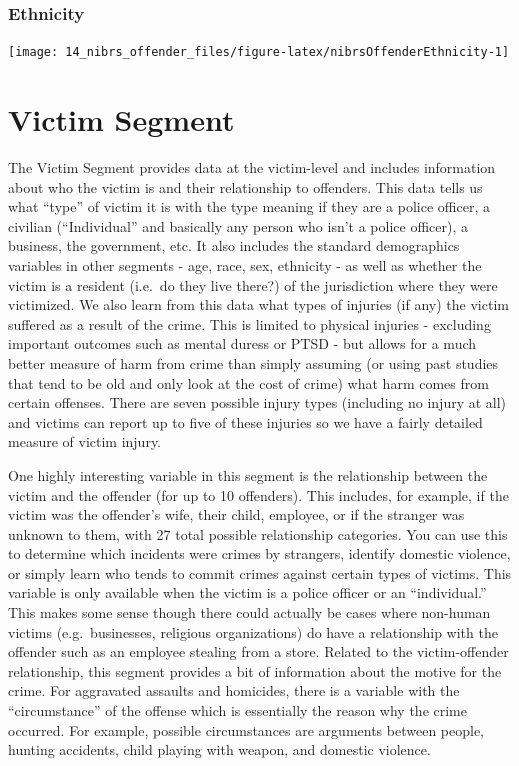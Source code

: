 \documentclass[
]{krantz}
\let\origfigure\figure
\let\endorigfigure\endfigure
\renewenvironment{figure}[1][2] {
    \expandafter\origfigure\expandafter[H]
} {
    \endorigfigure
}
\begin{document}
\subsection{Ethnicity}\label{ethnicity-2}

\begin{figure}

{\centering \texttt{[image: 14\_nibrs\_offender\_files/figure-latex/nibrsOffenderEthnicity-1]} 

}

\caption{The share of offenders by ethnicity, 1991-2022.}\label{fig:nibrsOffenderEthnicity}
\end{figure}

\chapter{Victim Segment}\label{victim-segment-1}

The Victim Segment provides data at the victim-level and
includes information about who the victim is and their
relationship to offenders. This data tells us what ``type''
of victim it is with the type meaning if they are a police
officer, a civilian (``Individual'' and basically any person
who isn't a police officer), a business, the government,
etc. It also includes the standard demographics variables in
other segments - age, race, sex, ethnicity - as well as
whether the victim is a resident (i.e.~do they live there?)
of the jurisdiction where they were victimized. We also
learn from this data what types of injuries (if any) the
victim suffered as a result of the crime. This is limited to
physical injuries - excluding important outcomes such as
mental duress or PTSD - but allows for a much better measure
of harm from crime than simply assuming (or using past
studies that tend to be old and only look at the cost of
crime) what harm comes from certain offenses. There are
seven possible injury types (including no injury at all) and
victims can report up to five of these injuries so we have a
fairly detailed measure of victim injury.

One highly interesting variable in this segment is the
relationship between the victim and the offender (for up to
10 offenders). This includes, for example, if the victim was
the offender's wife, their child, employee, or if the
stranger was unknown to them, with 27 total possible
relationship categories. You can use this to determine which
incidents were crimes by strangers, identify domestic
violence, or simply learn who tends to commit crimes against
certain types of victims. This variable is only available
when the victim is a police officer or an ``individual.''
This makes some sense though there could actually be cases
where non-human victims (e.g.~businesses, religious
organizations) do have a relationship with the offender such
as an employee stealing from a store. Related to the
victim-offender relationship, this segment provides a bit of
information about the motive for the crime. For aggravated
assaults and homicides, there is a variable with the
``circumstance'' of the offense which is essentially the
reason why the crime occurred. For example, possible
circumstances are arguments between people, hunting
accidents, child playing with weapon, and domestic violence.
\end{document}
